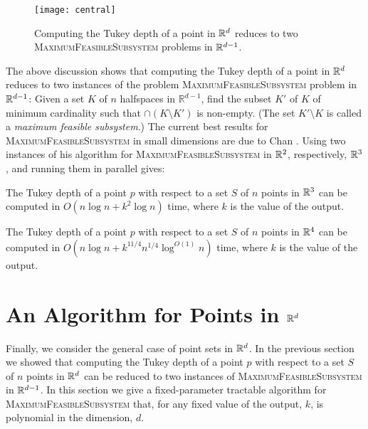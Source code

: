 \documentclass[12pt]{article}
\begin{document}
\begin{figure}
\begin{center}\texttt{[image: central]}\end{center}
\caption{Computing the Tukey depth of a point in $\mathbb{R}^d$ reduces to two
\textsc{MaximumFeasibleSubsystem} problems in $\mathbb{R}^{d-1}$.}
\end{figure}

The above discussion shows that computing the Tukey depth of a point
in $\mathbb{R}^d$ reduces to two instances of the problem
\textsc{MaximumFeasibleSubsystem} problem in $\mathbb{R}^{d-1}$: Given a set
$K$ of $n$ halfspaces in $\mathbb{R}^{d-1}$, find the subset $K'$ of
$K$ of minimum cardinality such that $\cap (K\setminus K')$ is
non-empty. (The set $K'\setminus K$ is called a \emph{maximum feasible
subsystem}.)  The current best results for
\textsc{MaximumFeasibleSubsystem} in small dimensions are due to Chan
\cite{c05}.  Using two instances of his algorithm for
\textsc{MaximumFeasibleSubsystem} in $\mathbb{R}^2$, respectively, $\mathbb{R}^3$, and
running them in parallel gives:

\begin{thm}
The Tukey depth of a point $p$ with respect to a set $S$ of $n$ points
in $\mathbb{R}^3$ can be computed in $O(n\log n + k^2\log n)$ time, where
$k$ is the value of the output.
\end{thm}


\begin{thm}
The Tukey depth of a point $p$ with respect to a set $S$ of $n$ points
in $\mathbb{R}^4$ can be computed in $O(n\log n + k^{11/4}n^{1/4}\log^{O(1)}
n)$ time, where $k$ is the value of the output.
\end{thm}

\section{An Algorithm for Points in $\mathbb{R}^d$}

Finally, we consider the general case of point sets in $\mathbb{R}^d$.  In the
previous section we showed that computing the Tukey depth of a point
$p$ with respect to a set $S$ of $n$ points in $\mathbb{R}^d$ can be reduced
to two instances of \textsc{MaximumFeasibleSubsystem} in $\mathbb{R}^{d-1}$.
In this section we give a fixed-parameter tractable \cite{df98}
algorithm for \textsc{MaximumFeasibleSubsystem} that, for any fixed
value of the output, $k$, is polynomial in the dimension, $d$.   
\end{document}

